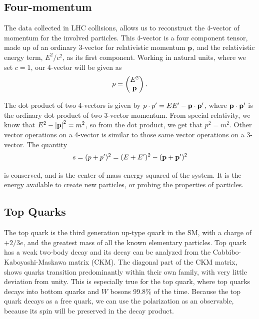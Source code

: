 \documentclass[12pt,a4paper]{article}
\begin{document}
\subsection{Four-momentum}
The data collected in LHC collisions, allows us to reconstruct the 4-vector of
momentum for the involved particles. This 4-vector is a four component tensor,
made up of an ordinary 3-vector for relativistic momentum $\vb p$, and the
relativistic energy term, $E^2/c^2$, as its first component. Working in natural
units, where we set $c=1$, our 4-vector will be given as
\begin{equation}
p = \left(\begin{matrix} E^2 \\ \vb p \end{matrix} \right).
\end{equation}

The dot product of two 4-vectors is given by $p\cdot p' = E E' - \vb p \cdot \vb{p'}$,
where $\vb p \cdot \vb{p'}$ is the ordinary dot product of two 3-vector momentum.
From special relativity, we know that $E^2 - \abs{\vb p}^2 = m^2$, so from the
dot product, we get that $p^2 = m^2$. Other vector operations on a 4-vector is
similar to those same vector operations on a 3-vector. The quantity
\begin{equation}
s = (p + p')^2 = (E + E')^2 - (\vb p + \vb p')^2
\end{equation}

is conserved, and is the center-of-mass energy squared of the system. It is the
energy available to create new particles, or probing the properties of
particles.

\subsection{Top Quarks}
The top quark is the third generation up-type quark in the SM, with a charge of
$+2/3 e$, and the greatest mass of all the known elementary particles. Top quark
has a weak two-body decay and its decay can be analyzed from the
Cabbibo-Kaboyashi-Maskawa matrix (CKM). The diagonal part of the CKM matrix,
shows quarks transition predominantly within their own family, with very little
deviation from unity. This is especially true for the top quark, where top
quarks decays into bottom quarks and $W$ bosons 99.8\% of the time. Because the
top quark decays as a free quark, we can use the polarization as an observable,
because its spin will be preserved in the decay product.\\
\end{document}

